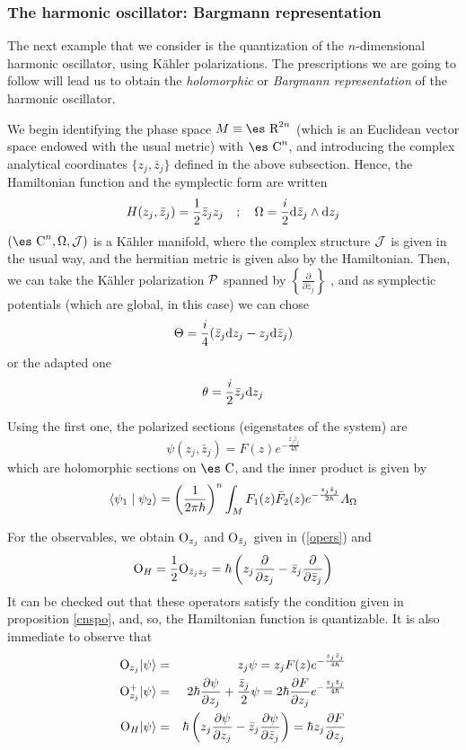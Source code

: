 \documentclass[12pt]{article}
\def\beann{\begin{eqnarray*}}
\def\eeann{\end{eqnarray*}}
\def\dst{\(}
\def\derpar#1#2{\frac{\partial{#1}}{\partial{#2}}}
\def\d{{\rm d}}
\def\P{{\cal P}}
\def\sta{|\psi \rangle }
\def\Op{{\rm O}}
\def\Real{\mbox{\es R}}
\def\Complex{\mbox{\es C}}
\def\LF{{\mit\Lambda}_{\Omega}}
\begin{document}
\subsubsection{The harmonic oscillator: Bargmann representation}


The next example that we consider
is the quantization of the $n$-dimensional harmonic oscillator,
using K\"ahler polarizations.
The prescriptions we are going to follow
will lead us to obtain the
{\it holomorphic} or {\it Bargmann representation}
of the harmonic oscillator.

We begin  identifying the phase space
$M \equiv \Real^{2n}$
(which is an Euclidean vector space endowed with the usual metric)
with $\Complex^n$,
and introducing the complex analytical coordinates
$\{ z_j, \bar z_j \}$
defined in the above subsection.
Hence, the Hamiltonian function
and the symplectic form are written
$$
H(z_j,\bar z_j)=\frac{1}{2}\bar z_j z_j
\quad ; \quad
\Omega=\frac{i}{2} \d \bar z_j \wedge \d z_j
$$
$(\Complex^n ,\Omega ,{\cal J})$ is a K\"ahler manifold,
where the complex structure ${\cal J}$ is given in the usual way,
and the hermitian metric is given also by the Hamiltonian.
Then, we can take the K\"ahler polarization $\P$ spanned by
\dst\left\{ \derpar{}{\bar z_j} \right\}\) , and as symplectic
potentials
(which are global, in this case)
we can chose
$$
\Theta = \frac{i}{4}(\bar z_j \d z_j - z_j \d \bar z_j)
$$
or the adapted one
$$
\theta = \frac{i}{2}\bar z_j\d z_j
$$

Using the first one, the polarized sections
(eigenstates of the system) are
$$
\psi (z_j,\bar z_j) = F(z) e^{-\frac{z_j \bar z_j}{4\hbar}}
$$
which are holomorphic sections on $\Complex$,
and the inner product is given by
$$
\langle \psi_1 \mid \psi_2\rangle  =\left( \frac{1}{2\pi \hbar}
\right)^n
\int_M F_1(z)\bar F_2(z) e^{-\frac{z_j\bar z_j}{2\hbar}}\LF
$$

For the observables, we obtain
$\Op_{z_j}$ and $\Op_{\bar z_j}$ given in
(\ref{opers}) and
$$
\Op_H = \frac{1}{2}\Op_{\bar z_j z_j} =
\hbar \left( z_j\derpar{}{z_j}-\bar z_j \derpar{}{\bar z_j} \right)
$$
It can be checked out that these operators
satisfy the condition given in proposition
\ref{cnspo}, and, so, the Hamiltonian function is quantizable.
It is also immediate to observe that
\beann
\Op_{z_j} \sta &=& z_j \psi = z_j F(z)e^{-\frac{z_j\bar z_j}{4\hbar}}
\\
\Op_{z_j}^+\sta &=& 2\hbar\derpar{\psi}{z_j}+\frac{\bar z_j}{2}\psi
= 2\hbar\derpar{F}{z_j}e^{-\frac{z_j\bar z_j}{4\hbar}}
\\
\Op_H\sta &=& \hbar\left( z_j\derpar{\psi}{z_j} -\bar
z_j\derpar{\psi}{\bar z_j}\right) = \hbar z_j \derpar{F}{z_j}
\eeann
\end{document}
